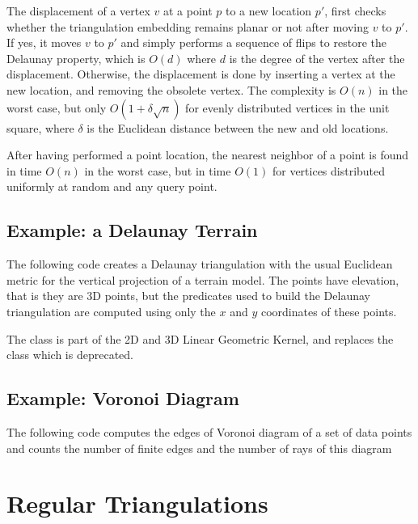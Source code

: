 The displacement of a vertex $v$ at a point $p$ to a new location $p'$, first checks whether the triangulation embedding remains
planar or not after moving $v$ to $p'$. If yes, it moves $v$ to $p'$ and simply performs a sequence of flips
to restore the Delaunay property, which is $O(d)$ where $d$ is the degree of the vertex after the displacement. 
Otherwise, the displacement is done by inserting a vertex at the new location,
and removing the obsolete vertex. 
The complexity is $O(n)$ in the worst case, but only $O(1 + \delta \sqrt{n})$ for evenly distributed vertices in the unit square, where $\delta$ is the Euclidean distance between the new and old locations.

After having performed a  point location, the
nearest neighbor of a point is found in time $O(n)$ in the
worst case, but in time $O(1)$
for vertices distributed uniformly at random  and any query point. 


\subsection{Example: a Delaunay Terrain\label{Subsection_2D_Triangulations_Delaunay_Terrain}}

The following code  creates a Delaunay triangulation with 
the usual Euclidean metric for the vertical projection of a 
terrain model. The points have elevation, that is they are 3D points,
but the predicates used to build the  Delaunay triangulation
are computed using only  the $x$ and $y$ coordinates  
of these points. 

The class  is part of the 2D and 3D Linear Geometric Kernel,
and replaces the class  which is deprecated.


\subsection{Example: Voronoi Diagram\label{Subsection_2D_Triangulations_Voronoi}}
The following code computes the edges of Voronoi diagram
of a set of data points
and counts  the number of finite edges and the number of rays
of this diagram


\section{Regular Triangulations\label{Section_2D_Triangulations_Regular}}

